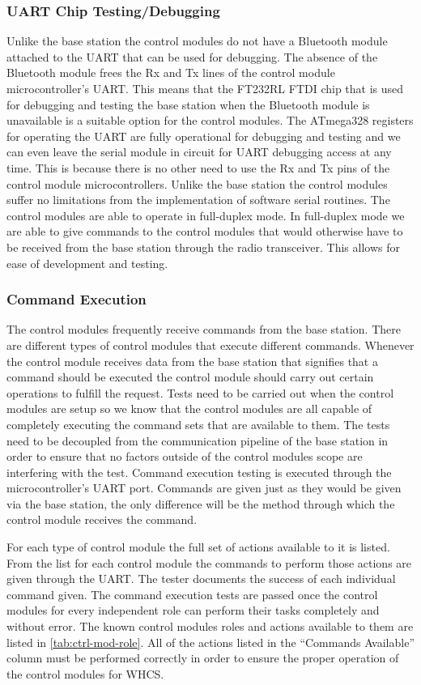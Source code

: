 \subsubsection{UART Chip Testing/Debugging}
Unlike the base station the control modules do not have a Bluetooth module
attached to the UART that can be used for debugging. The absence of the
Bluetooth module frees the Rx and Tx lines of the control module
microcontroller{}'s UART. This means that the FT232RL FTDI chip that is 
used for debugging and testing the base station when the Bluetooth module is
unavailable is a suitable option for the control modules. The ATmega328
registers for operating the UART are fully operational for debugging and
testing and we can even leave the serial module in circuit for UART debugging
access at any time. This is because there is no other need to use the Rx
and Tx pins of the control module microcontrollers. Unlike the base station the
control modules suffer no limitations from the implementation of software
serial routines. The control modules are able to operate in full{}-duplex
mode. In full{}-duplex mode we are able to give commands to the control
modules that would otherwise have to be received from the base station through
the radio transceiver. This allows for ease of development and testing.

\subsubsection{Command Execution}

The control modules frequently receive commands from the base
station. There are different types of control modules that execute
different commands. Whenever the control module receives data from the base
station that signifies that a command should be executed the control module
should carry out certain operations to fulfill the request. Tests need to
be carried out when the control modules are setup so we know that the control
modules are all capable of completely executing the command sets that are
available to them. The tests need to be decoupled from the communication
pipeline of the base station in order to ensure that no factors outside of the
control modules scope are interfering with the test. Command execution testing
is executed through the microcontroller{}'s UART port. Commands are 
given just as they would be given via the base station, the only difference
will be the method through which the control module receives the command.

For each type of control module the full set of actions available to it is 
listed. From the list for each control module the commands to perform those
actions are given through the UART. The tester documents the success of
each individual command given. The command execution tests are passed once the
control modules for every independent role can perform their tasks completely
and without error. The known control modules roles and actions available to
them are listed in \autoref{tab:ctrl-mod-role}. All of the actions listed in the
{}``Commands Available{}'' column must be performed correctly in order to
ensure the proper operation of the control modules for WHCS.

